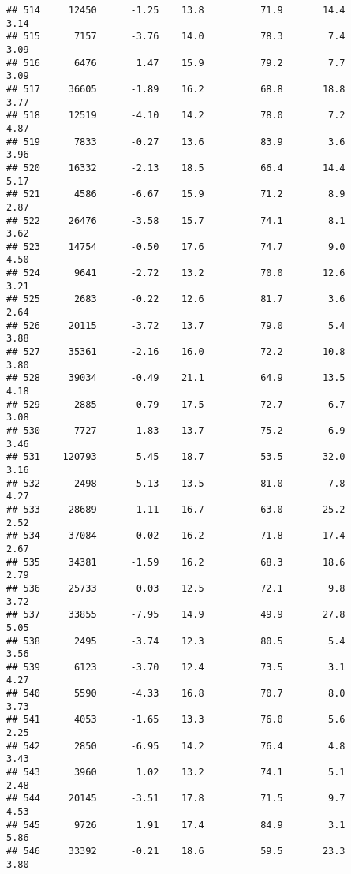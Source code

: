 \documentclass[
]{article}
\begin{document}
\begin{verbatim}
## 514     12450      -1.25    13.8          71.9       14.4              3.14
## 515      7157      -3.76    14.0          78.3        7.4              3.09
## 516      6476       1.47    15.9          79.2        7.7              3.09
## 517     36605      -1.89    16.2          68.8       18.8              3.77
## 518     12519      -4.10    14.2          78.0        7.2              4.87
## 519      7833      -0.27    13.6          83.9        3.6              3.96
## 520     16332      -2.13    18.5          66.4       14.4              5.17
## 521      4586      -6.67    15.9          71.2        8.9              2.87
## 522     26476      -3.58    15.7          74.1        8.1              3.62
## 523     14754      -0.50    17.6          74.7        9.0              4.50
## 524      9641      -2.72    13.2          70.0       12.6              3.21
## 525      2683      -0.22    12.6          81.7        3.6              2.64
## 526     20115      -3.72    13.7          79.0        5.4              3.88
## 527     35361      -2.16    16.0          72.2       10.8              3.80
## 528     39034      -0.49    21.1          64.9       13.5              4.18
## 529      2885      -0.79    17.5          72.7        6.7              3.08
## 530      7727      -1.83    13.7          75.2        6.9              3.46
## 531    120793       5.45    18.7          53.5       32.0              3.16
## 532      2498      -5.13    13.5          81.0        7.8              4.27
## 533     28689      -1.11    16.7          63.0       25.2              2.52
## 534     37084       0.02    16.2          71.8       17.4              2.67
## 535     34381      -1.59    16.2          68.3       18.6              2.79
## 536     25733       0.03    12.5          72.1        9.8              3.72
## 537     33855      -7.95    14.9          49.9       27.8              5.05
## 538      2495      -3.74    12.3          80.5        5.4              3.56
## 539      6123      -3.70    12.4          73.5        3.1              4.27
## 540      5590      -4.33    16.8          70.7        8.0              3.73
## 541      4053      -1.65    13.3          76.0        5.6              2.25
## 542      2850      -6.95    14.2          76.4        4.8              3.43
## 543      3960       1.02    13.2          74.1        5.1              2.48
## 544     20145      -3.51    17.8          71.5        9.7              4.53
## 545      9726       1.91    17.4          84.9        3.1              5.86
## 546     33392      -0.21    18.6          59.5       23.3              3.80

\end{verbatim}
\end{document}
